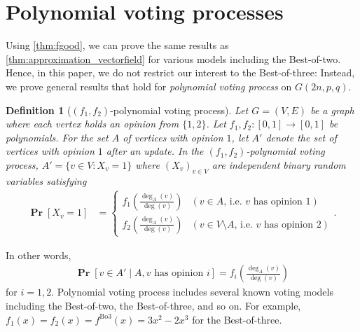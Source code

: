 \documentclass[letterpaper,11pt]{article}
\newtheorem{definition}[theorem]{Definition}
\newcommand{\Bthree}{\mathrm{Bo3}}
\renewcommand\Pr{\mathop{\mathbf{Pr}}}
\begin{document}
\section{Polynomial voting processes
\label{sec:polynomialvoting}}
Using \cref{thm:fgood}, we can prove the same results as \cref{thm:approximation_vectorfield} for various models including the Best-of-two.
Hence, in this paper, we do not restrict our interest to the Best-of-three: Instead, we prove general results that hold for \emph{polynomial voting process} on $G(2n,p,q)$.

\begin{definition}[$(f_1,f_2)$-polynomial voting process]
Let $G=(V,E)$ be a graph where each vertex holds an opinion from $\{1,2\}$.
Let $f_1,f_2: [0,1]\to [0,1]$ be polynomials.
For the set $A$ of vertices with opinion $1$,
let $A'$ denote the set of vertices with opinion $1$ after an update.
In the $(f_1,f_2)$-polynomial voting process, $A'= \{v\in V: X_v=1\}$ where $(X_v)_{v\in V}$ are independent binary random variables satisfying
\begin{align*}
\Pr[X_v=1]&=
\begin{cases}
f_1\left(\frac{\deg_A(v)}{\deg(v)}\right) &(\textrm{$v\in A$, i.e.~$v$ has opinion $1$})\\
f_2\left(\frac{\deg_A(v)}{\deg(v)}\right) &(\textrm{$v\in V\setminus A$, i.e.~$v$ has opinion $2$})
\end{cases}.
\end{align*}
\end{definition}
In other words, 
\begin{align*}
\Pr[v\in A'\mid A,\text{$v$ has opinion $i$}] = f_i\left(\frac{\deg_A(v)}{\deg(v)}\right) %
\end{align*}
for $i=1,2$.
%
Polynomial voting process includes several known voting models including the Best-of-two, the Best-of-three, and so on.
For example, $f_1(x)=f_2(x)=f^{\Bthree}(x)=3x^2-2x^3$ for the Best-of-three.
\end{document}
